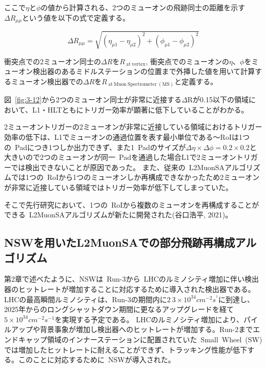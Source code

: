 ここで$\eta$と$\phi$の値から計算される、2つのミューオンの飛跡同士の距離を示す$\Delta R_{\mu\mu}$という値を以下の式で定義する。

\begin{equation}
    \Delta R_{\mu \mu}=\sqrt{\left(\eta_{\mu 1}-\eta_{\mu 2}\right)^2+\left(\phi_{\mu 1}-\phi_{\mu 2}\right)^2}
\end{equation}

衝突点での2ミューオン同士の$\Delta R$を$R_{\mathrm{~at~vertex}}$, 衝突点でのミューオンの$\eta$、$\phi$をミューオン検出器のあるミドルステーションの位置まで外挿した値を用いて計算するミューオン検出器での$\Delta R$を$R_{\mathrm{~at~Muon~Spectrometer~(MS)}}$と定義する。

図~\ref{fig:3-12}から2つのミューオン同士が非常に近接する$\Delta \mathrm{R}$が0.15以下の領域において、L1・HLTともにトリガー効率が顕著に低下していることがわかる。

2ミューオントリガーの2ミューオンが非常に近接している領域におけるトリガー効率の低下は、L1でミューオンの通過位置を表す最小単位である～RoIは1つの~Padにつき1つしか出力できず、また1~Padのサイズが$\Delta\eta\times\Delta\phi=0.2\times0.2$と大きいので2つのミューオンが同一~Padを通過した場合L1で2ミューオントリガーでは検出できないことが原因であった。
また、従来の~L2MuonSAアルゴリズムでは1つの~RoIから1つのミューオンしか再構成できなかったため2ミューオンが非常に近接している領域ではトリガー効率が低下してしまっていた。

そこで先行研究\cite{article:taniguchi}において、1つの~RoIから複数のミューオンを再構成することができる~L2MuonSAアルゴリズムが新たに開発された(谷口浩平, 2021)。


\subsection{NSWを用いたL2MuonSAでの部分飛跡再構成アルゴリズム}\label{chapter3-3-2}
第2章で述べたように、NSWは~Run-3から~LHCのルミノシティ増加に伴い検出器のヒットレートが増加することに対応するために導入された検出器である。
LHCの最高瞬間ルミノシティは、Run-3の期間内に$2~3\times10^{34}cm^{-2}s^{^1}$に到達し、2025年からのロングシャットダウン期間に更なるアップグレードを経て$5\times10^{34}cm^{-2}s^{-1}$を実現する予定である。
LHCのルミノシティ増加により、パイルアップや背景事象が増加し検出器へのヒットレートが増加する。Run-2までエンドキャップ領域のインナーステーションに配置されていた~Small~Wheel~(SW)では増加したヒットレートに耐えることができず、トラッキング性能が低下する。このことに対応するために~NSWが導入された。

